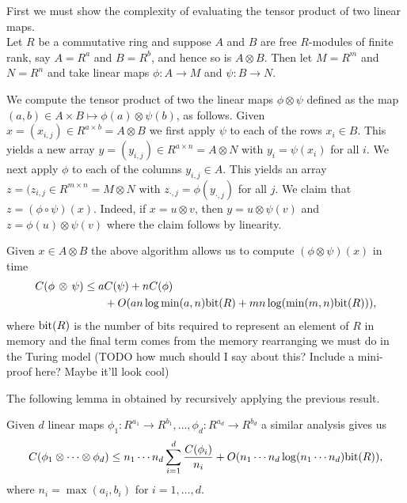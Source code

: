 First we must show the complexity of evaluating the tensor product of two linear maps.\\
Let $R$ be a commutative ring and suppose $A$ and $B$ are free $R$-modules of finite rank, say $A = R^a$ and $B = R^b$, and hence so is $A \otimes B$. Then let $M = R^m$ and $N = R^n$ and take linear maps $\phi: A \to M$ and $\psi : B \to N$.

We compute the tensor product of two the linear maps $\phi \otimes \psi$ defined as the map $(a, b) \in A\times B \mapsto \phi(a) \otimes \psi(b)$, as follows. Given $x = (x_{i,j}) \in R^{a \times b} = A \otimes B$ we first apply $\psi$ to each of the rows $x_i \in B$. This yields a new array $y = (y_{i, j}) \in R^{a \times n} = A \otimes N$ with $y_i = \psi(x_i)$ for all $i$. We next apply $\phi$ to each of the columns $y_{i, j} \in A$. This yields an array $z = (z_{i, j} \in R^{m \times n} = M \otimes N$ with $z_{\cdot , j} = \phi(y_{\cdot, j})$ for all $j$. We claim that $z = (\phi \circ \psi)(x)$. Indeed, if $x = u \otimes v$, then $y = u \otimes \psi(v)$ and $z = \phi(u) \otimes \psi(v)$ where the claim follows by linearity.

Given $x \in A \otimes B$ the above algorithm allows us to compute $(\phi \otimes \psi) (x)$ in time
\begin{align*}
    C(\phi \,\otimes\, \psi) \leq a&C(\psi) + nC(\phi)\\
                                   &+ O(a n \log \min(a, n) \textrm{bit}(R) + m n \log( \min (m, n)\textrm{bit}(R))),
\end{align*}
where $\textrm{bit}(R)$ is the number of bits required to represent an element of $R$ in memory and the final term comes from the memory rearranging we must do in the Turing model (TODO how much should I say about this? Include a mini-proof here? Maybe it'll look cool)

The following lemma in obtained by recursively applying the previous result.

\begin{lemma}\label{lem:multi-dim-dft}
    Given $d$ linear maps $\phi_1: R^{a_1} \to R^{b_1}, \ldots, \phi_d: R^{a_d} \to R^{b_d}$ a similar analysis gives us
    \[
        C(\phi_1 \otimes \cdots \otimes \phi_d) \leq n_1\cdots n_d \sum^d_{i = 1} \frac{C(\phi_i)}{n_i} + O(n_1\cdots n_d \log (n_1 \cdots n_d) \textrm{bit}(R)),
    \]
    where $n_i = \max(a_i, b_i)$ for $i = 1, \ldots, d$.
\end{lemma}


